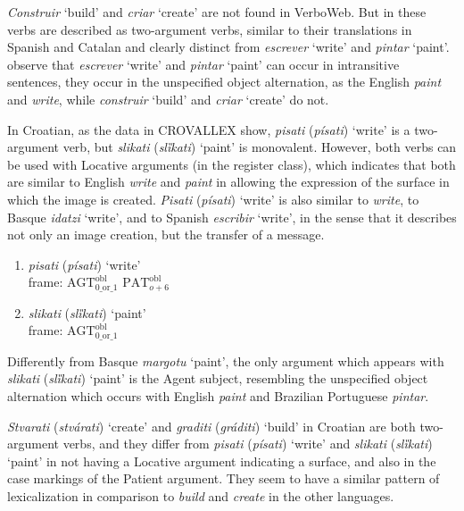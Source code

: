 \documentclass[english]{textolivre}
\begin{document}
\textit{Construir} ‘build’ and \textit{criar} ‘create’ are not found in VerboWeb. But in \textcite{amaral_verbos_2014} these verbs are described as two-argument verbs, similar to their translations in Spanish and Catalan and clearly distinct from \textit{escrever} ‘write’ and \textit{pintar} ‘paint’. \textcite{amaral_verbos_2014} observe that \textit{escrever} ‘write’ and \textit{pintar} ‘paint’ can occur in intransitive sentences, they occur in the unspecified object alternation, as the English \textit{paint} and \textit{write}, while \textit{construir} ‘build’ and \textit{criar} ‘create’ do not.

In Croatian, as the data in CROVALLEX show, \textit{pisati} (\textit{písati}) ‘write’ is a two-argument verb, but \textit{slikati} (\textit{slȉkati}) ‘paint’ is monovalent. However, both verbs can be used with Locative arguments (in the register class), which indicates that both are similar to English \textit{write} and \textit{paint} in allowing the expression of the surface in which the image is created. \textit{Pisati} (\textit{písati}) ‘write’ is also similar to \textit{write}, to Basque \textit{idatzi} ‘write’, and to Spanish \textit{escribir} ‘write’, in the sense that it describes not only an image creation, but the transfer of a message.

\begin{enumerate}[label=(\arabic*),resume]
\item \label{itm36} \textit{pisati} (\textit{písati}) ‘write’ \\
 frame: $\text{AGT}^{\text{obl}}_{0\text{\_or\_}1}$
 $\text{PAT}^{\text{obl}}_{o+6}$
 \item \label{itm37} \textit{slikati} (\textit{slȉkati}) ‘paint’ \\
 frame: $\text{AGT}^{\text{obl}}_{0\text{\_or\_}1}$ 
\end{enumerate}

Differently from Basque \textit{margotu} ‘paint’, the only argument which appears with \textit{slikati} (\textit{slȉkati}) ‘paint’ is the Agent subject, resembling the unspecified object alternation which occurs with English \textit{paint} and Brazilian Portuguese \textit{pintar}.

\textit{Stvarati} (\textit{stvárati}) ‘create’ and \textit{graditi} (\textit{gráditi}) ‘build’ in Croatian are both two-argument verbs, and they differ from \textit{pisati} (\textit{písati}) ‘write’ and \textit{slikati} (\textit{slȉkati}) ‘paint’ in not having a Locative argument indicating a surface, and also in the case markings of the Patient argument. They seem to have a similar pattern of lexicalization in comparison to \textit{build} and \textit{create} in the other languages.
\end{document}
